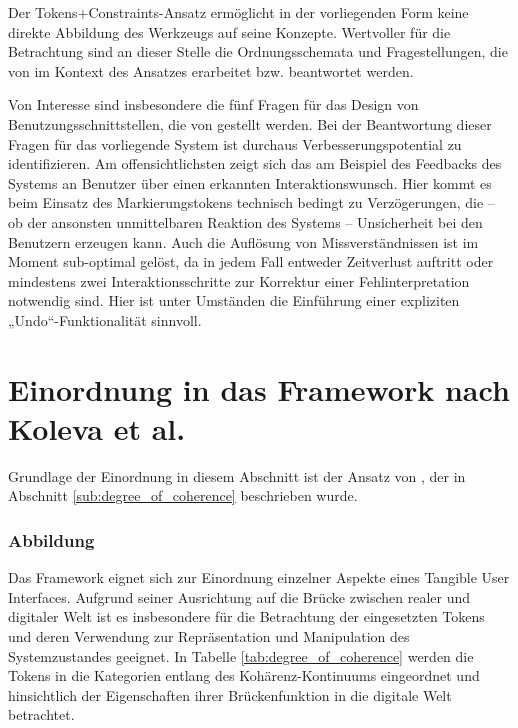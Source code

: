 Der Tokens+Constraints-Ansatz ermöglicht in der vorliegenden Form keine direkte Abbildung des Werkzeugs auf seine Konzepte. Wertvoller für die Betrachtung sind an dieser Stelle die Ordnungsschemata und Fragestellungen, die von \citet{Ullmer05} im Kontext des Ansatzes erarbeitet bzw. beantwortet werden. 

Von Interesse sind insbesondere die fünf Fragen für das Design von Benutzungsschnittstellen, die von  \citep{Bellotti02} gestellt werden. Bei der Beantwortung dieser Fragen für das vorliegende System ist durchaus Verbesserungspotential zu identifizieren. Am offensichtlichsten zeigt sich das am Beispiel des Feedbacks des Systems an Benutzer über einen erkannten Interaktionswunsch. Hier kommt es beim Einsatz des Markierungstokens technisch bedingt zu Verzögerungen, die -- ob der ansonsten unmittelbaren Reaktion des Systems -- Unsicherheit bei den Benutzern erzeugen kann. Auch die Auflösung von Missverständnissen ist im Moment sub-optimal gelöst, da in jedem Fall entweder Zeitverlust auftritt oder mindestens zwei Interaktionsschritte zur Korrektur einer Fehlinterpretation notwendig sind. Hier ist unter Umständen die Einführung einer expliziten „Undo“-Funktionalität sinnvoll.


\section{Einordnung in das Framework nach Koleva et al.} %
\label{sec:einordnung_in_das_framework_nach_koleva_et_al_}

Grundlage der Einordnung in diesem Abschnitt ist der Ansatz von \citet{Koleva03}, der in Abschnitt \ref{sub:degree_of_coherence} beschrieben wurde.

\subsubsection{Abbildung} %
\label{sub:abbildung}

Das Framework eignet sich zur Einordnung einzelner Aspekte eines Tangible User Interfaces. Aufgrund seiner Ausrichtung auf die Brücke zwischen realer und digitaler Welt ist es insbesondere für die Betrachtung der eingesetzten Tokens und deren Verwendung zur Repräsentation und Manipulation des Systemzustandes geeignet. In Tabelle \ref{tab:degree_of_coherence} werden die Tokens in die Kategorien entlang des Kohärenz-Kontinuums eingeordnet und hinsichtlich der Eigenschaften ihrer Brückenfunktion in die digitale Welt betrachtet. 

